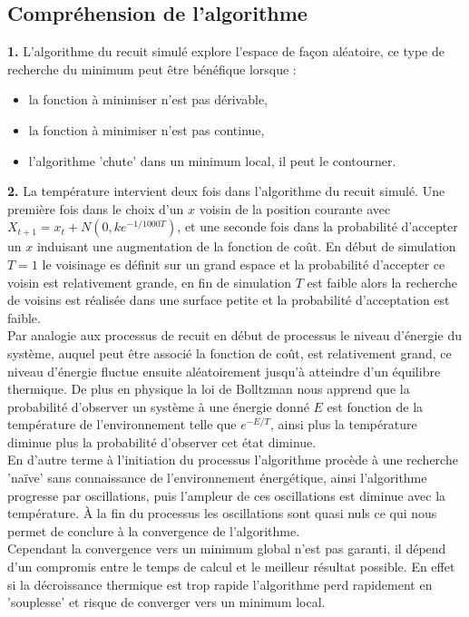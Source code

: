 \documentclass[12pt]{article}
\begin{document}
\subsection{Compréhension de l’algorithme}
\textbf{\color{brick}1.} L'algorithme du recuit simulé explore l'espace de façon aléatoire, ce type de recherche du minimum peut être bénéfique lorsque :
\begin{itemize}
    \item la fonction à minimiser n'est pas dérivable,
    \item la fonction à minimiser n'est pas continue,
    \item l'algorithme 'chute' dans un minimum local, il peut le contourner.
\end{itemize}
\vspace{0.5cm}
\textbf{\color{brick}2.} La température intervient deux fois dans l'algorithme du recuit simulé. Une première fois dans le choix d'un $x$ voisin de la position courante avec $X_{t+1}= x_t + N(0, ke^{-1/1000T})$, et une seconde fois dans la probabilité d'accepter un $x$ induisant une augmentation de la fonction de coût. En début de simulation  $T =1$ le voisinage es définit sur un grand espace et la probabilité d'accepter ce voisin est relativement grande, en fin de simulation $T$ est faible alors la recherche de voisins est réalisée dans une surface petite et la probabilité d'acceptation est faible. \\
Par analogie aux processus de recuit en début de processus le niveau d'énergie du système, auquel peut être associé la fonction de coût, est relativement grand, ce niveau d'énergie fluctue ensuite aléatoirement jusqu'à atteindre d'un équilibre thermique. De plus en physique la loi de Bolltzman nous apprend que la probabilité d'observer un système à une énergie donné $E$ est fonction de la température de l'environnement telle que $e^{-E/T}$, ainsi plus la température diminue plus la probabilité d'observer cet état diminue.  \\
En d'autre terme à l'initiation du processus l'algorithme procède à une recherche 'naïve' sans connaissance de l'environnement énergétique, ainsi l'algorithme progresse  par  oscillations, puis l'ampleur de ces oscillations est diminue avec la température. À la fin du processus les oscillations sont quasi nuls ce qui nous permet de conclure à la convergence de l'algorithme.\\
Cependant la convergence vers un minimum global n'est pas garanti, il dépend d'un compromis entre le temps de calcul et le meilleur résultat possible. En effet si la décroissance thermique est trop rapide l'algorithme perd rapidement en 'souplesse' et risque de converger vers un minimum local.\\
\end{document}
